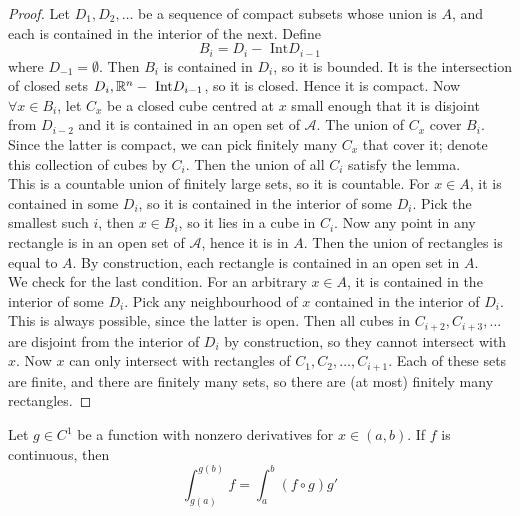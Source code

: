 \documentclass[12pt]{article}
\begin{document}
\begin{proof}
    Let $D_1, D_2, \dots$ be a sequence of compact subsets whose union is $A$, and each is contained in the interior of the next. Define
    $$B_i = D_i - \text{ Int}D_{i-1}$$
    where $D_{-1} = \emptyset$. Then $B_i$ is contained in $D_i$, so it is bounded. It is the intersection of closed sets $D_i, \mathbb{R}^n - \text{ Int}D_{i-1}$, so it is closed. Hence it is compact. Now $\forall x \in B_i$, let $C_x$ be a closed cube centred at $x$ small enough that it is disjoint from $D_{i-2}$ and it is contained in an open set of $\mathcal A$. The union of $C_x$ cover $B_i$. Since the latter is compact, we can pick finitely many $C_x$ that cover it; denote this collection of cubes by $C_i$. Then the union of all $C_i$ satisfy the lemma. \\
    This is a countable union of finitely large sets, so it is countable. For $x \in A$, it is contained in some $D_i$, so it is contained in the interior of some $D_i$. Pick the smallest such $i$, then $x \in B_i$, so it lies in a cube in $C_i$. Now any point in any rectangle is in an open set of $\mathcal A$, hence it is in $A$. Then the union of rectangles is equal to $A$. By construction, each rectangle is contained in an open set in $A$. \\
    We check for the last condition. For an arbitrary $x \in A$, it is contained in the interior of some $D_i$. Pick any neighbourhood of $x$ contained in the interior of $D_i$. This is always possible, since the latter is open. Then all cubes in $C_{i+2}, C_{i+3}, \dots$ are disjoint from the interior of $D_i$ by construction, so they cannot intersect with $x$. Now $x$ can only intersect with rectangles of $C_1, C_2, \dots, C_{i+1}$. Each of these sets are finite, and there are finitely many sets, so there are (at most) finitely many rectangles.
\end{proof}

\begin{thm}
    Let $g \in C^1$ be a function with nonzero derivatives for $x \in (a,b)$. If $f$ is continuous, then
    $$\int_{g(a)}^{g(b)} f = \int_a^b (f \circ g) g'$$
\end{thm}
\end{document}
